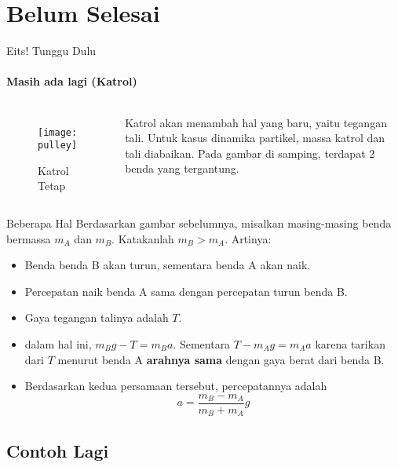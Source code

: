 \documentclass[10pt,aspectratio=54, handout]{beamer}
\begin{document}
  \section{Belum Selesai}
  \label{sec:Belum Selesai}
  
  \begin{frame}{Eits! Tunggu Dulu}
  \framesubtitle{Masih ada lagi (Katrol)}
  \begin{columns}
    \begin{figure}
    \begin{center}
        \texttt{[image: pulley]}
    \end{center}
    \caption{Katrol Tetap}
    
    \end{figure}
    
    
    
    Katrol akan menambah hal yang baru, yaitu tegangan tali. Untuk kasus dinamika partikel, massa katrol dan tali diabaikan. Pada gambar di samping, terdapat 2 benda yang tergantung.
  \end{columns}
  
    
    
  \end{frame}
   \begin{frame}{Beberapa Hal}
    Berdasarkan gambar sebelumnya, misalkan masing-masing benda bermassa $m_A$ dan $m_B$. Katakanlah $m_B>m_A$. Artinya:
    \begin{itemize}
      \item 
    Benda benda B akan turun, sementara benda A akan naik.
    
    \item Percepatan naik benda A sama dengan percepatan turun benda B.
    \item Gaya tegangan talinya adalah $T$.
    \item dalam hal ini, $m_B g - T = m_Ba$. Sementara $T - m_A g= m_A a$ karena tarikan dari $T$ menurut benda A \textbf{arahnya sama} dengan gaya berat dari benda B.
    \item Berdasarkan kedua persamaan tersebut, percepatannya adalah $$a=\frac{m_B-m_A}{m_B+m_A}g$$
    \end{itemize}
   \end{frame}
   
   \subsection{Contoh Lagi}
   \label{sub:Contoh Lagi}
   
\end{document}
